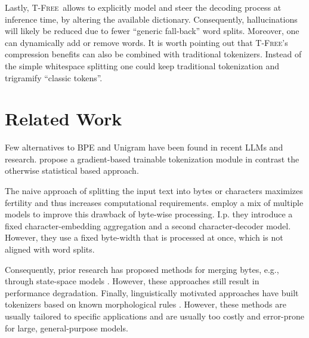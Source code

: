 \documentclass[11pt]{article}
\newcommand{\method}{\textsc{T-Free}}
\begin{document}
Lastly, \method\ allows to explicitly model and steer the decoding process at inference time, by altering the available dictionary. 
Consequently, hallucinations will likely be reduced due to fewer ``generic fall-back'' word splits. Moreover, one can dynamically add or remove words. 
It is worth pointing out that \method's compression benefits can also be combined with traditional tokenizers. Instead of the simple whitespace splitting one could keep traditional tokenization and trigramify ``classic tokens''. 



\section{Related Work}

Few alternatives to BPE and Unigram have been found in recent LLMs and research. 
\citet{charformer} propose a gradient-based trainable tokenization module in contrast the otherwise statistical based approach.

The naive approach of splitting the input text into bytes or characters maximizes fertility and thus increases computational requirements. 
\citet{megabyte} employ a mix of multiple models to improve this drawback of byte-wise processing. I.p. they introduce a fixed character-embedding aggregation and a second character-decoder model. However, they use a fixed byte-width that is processed at once, which is not aligned with word splits. 

Consequently, prior research has proposed methods for merging bytes, e.g., through state-space models \cite{wang2024mambabyte}.  However, these approaches still result in performance degradation. 
Finally, linguistically motivated approaches have built tokenizers based on known morphological rules \cite{jabbar2024morphpiece}. However, these methods are usually tailored to specific applications and are usually too costly and error-prone for large, general-purpose models.
\end{document}
